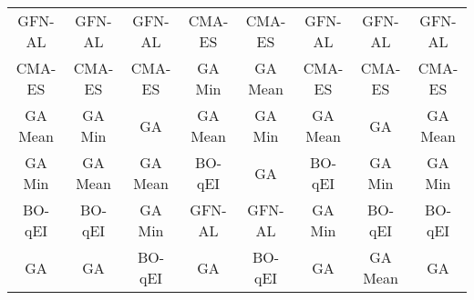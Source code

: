 \begin{table*}[h!]
\begin{minipage}{.9\textwidth}
\begin{adjustbox}{width=\linewidth,center}
\begin{tabular}{|c|c|c|c|c|c|c|c|}
\cellcolor[HTML]{F8E3A6}GFN-AL  & \cellcolor[HTML]{F8E3A6}GFN-AL  & \cellcolor[HTML]{F8E3A6}GFN-AL  & \cellcolor[HTML]{EAD1DC}CMA-ES & \cellcolor[HTML]{EAD1DC}CMA-ES & \cellcolor[HTML]{F8E3A6}GFN-AL  & \cellcolor[HTML]{F8E3A6}GFN-AL  & \cellcolor[HTML]{F8E3A6}GFN-AL  \\ 
\cellcolor[HTML]{EAD1DC}CMA-ES & \cellcolor[HTML]{EAD1DC}CMA-ES & \cellcolor[HTML]{EAD1DC}CMA-ES & \cellcolor[HTML]{CFE2F3}GA Min & \cellcolor[HTML]{F4CCCC}GA Mean  & \cellcolor[HTML]{EAD1DC}CMA-ES & \cellcolor[HTML]{EAD1DC}CMA-ES & \cellcolor[HTML]{EAD1DC}CMA-ES \\ 
\cellcolor[HTML]{F4CCCC}GA Mean  & \cellcolor[HTML]{CFE2F3}GA Min & \cellcolor[HTML]{D9D2E9}GA & \cellcolor[HTML]{F4CCCC}GA Mean  & \cellcolor[HTML]{CFE2F3}GA Min & \cellcolor[HTML]{F4CCCC}GA Mean  & \cellcolor[HTML]{D9D2E9}GA & \cellcolor[HTML]{F4CCCC}GA Mean  \\ 
\cellcolor[HTML]{CFE2F3}GA Min & \cellcolor[HTML]{F4CCCC}GA Mean  & \cellcolor[HTML]{F4CCCC}GA Mean  & \cellcolor[HTML]{B5DDCA}BO-qEI & \cellcolor[HTML]{D9D2E9}GA & \cellcolor[HTML]{B5DDCA}BO-qEI & \cellcolor[HTML]{CFE2F3}GA Min & \cellcolor[HTML]{CFE2F3}GA Min \\ 
\cellcolor[HTML]{B5DDCA}BO-qEI & \cellcolor[HTML]{B5DDCA}BO-qEI & \cellcolor[HTML]{CFE2F3}GA Min & \cellcolor[HTML]{F8E3A6}GFN-AL  & \cellcolor[HTML]{F8E3A6}GFN-AL  & \cellcolor[HTML]{CFE2F3}GA Min & \cellcolor[HTML]{B5DDCA}BO-qEI & \cellcolor[HTML]{B5DDCA}BO-qEI \\ 
\cellcolor[HTML]{D9D2E9}GA & \cellcolor[HTML]{D9D2E9}GA & \cellcolor[HTML]{B5DDCA}BO-qEI & \cellcolor[HTML]{D9D2E9}GA & \cellcolor[HTML]{B5DDCA}BO-qEI & \cellcolor[HTML]{D9D2E9}GA & \cellcolor[HTML]{F4CCCC}GA Mean  & \cellcolor[HTML]{D9D2E9}GA \\
            \bottomrule
            \end{tabular}
            \end{adjustbox}
      \label{tab:gfp_methods}
    \end{minipage}
\end{table*}